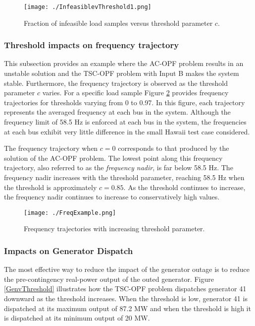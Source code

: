 \documentclass[lettersize,journal]{IEEEtran}
\begin{document}
\begin{figure}[h!]
    \centering
    \texttt{[image: ./InfeasiblevThreshold1.png]}
    \caption{Fraction of infeasible load samples versus threshold parameter $c$.}
    \label{fig:InfvThreshold}
\end{figure}



\subsubsection{Threshold impacts on frequency trajectory}\label{Sec:Feasibility}
This subsection provides an example where the AC-OPF problem results in an unstable solution and the TSC-OPF problem with Input B makes the system stable.  Furthermore, the frequency trajectory is observed as the threshold parameter $c$ varies.  For a specific load sample Figure \ref{fig:multfreq} provides frequency trajectories for thresholds varying from 0 to 0.97.  In this figure, each trajectory represents the averaged frequency at each bus in the system.  Although the frequency limit of 58.5 Hz is enforced at each bus in the system, the frequencies at each bus exhibit very little difference in the small Hawaii test case considered.

The frequency trajectory when $c=0$ corresponds to that produced by the solution of the AC-OPF problem.  The lowest point along this frequency trajectory, also referred to as the \emph{frequency nadir}, is far below 58.5 Hz.  The frequency nadir increases with the threshold parameter, reaching 58.5 Hz when the threshold is approximately $c=0.85$.  As the threshold continues to increase, the frequency nadir  continues to increase to conservatively high values.  %
\begin{figure}[h!]
    \centering
    \texttt{[image: ./FreqExample.png]}
    \caption{Frequency trajectories with increasing threshold parameter.}
    \label{fig:multfreq}
\end{figure}



\subsubsection{Impacts on Generator Dispatch}
The most effective way to reduce the impact of the generator outage is to reduce the pre-contingency real-power output of the outed generator. Figure \ref{GenvThreshold} illustrates how the TSC-OPF problem dispatches generator 41 downward as the threshold increases.  When the threshold is low, generator 41 is dispatched at its maximum output of 87.2 MW and when the threshold is high it is dispatched at its minimum output of 20 MW. 
\end{document}

